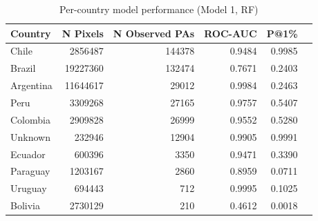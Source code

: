 \begin{table}[h]
\centering
\begin{tabular}{lrrrrr}
\toprule
Country & N Pixels & N Observed PAs & ROC-AUC & P@1\% \\
\midrule
Chile & 2856487 & 144378 & 0.9484 & 0.9985 \\
Brazil & 19227360 & 132474 & 0.7671 & 0.2403 \\
Argentina & 11644617 & 29012 & 0.9984 & 0.2463 \\
Peru & 3309268 & 27165 & 0.9757 & 0.5407 \\
Colombia & 2909828 & 26999 & 0.9552 & 0.5280 \\
Unknown & 232946 & 12904 & 0.9905 & 0.9991 \\
Ecuador & 600396 & 3350 & 0.9471 & 0.3390 \\
Paraguay & 1203167 & 2860 & 0.8959 & 0.0711 \\
Uruguay & 694443 & 712 & 0.9995 & 0.1025 \\
Bolivia & 2730129 & 210 & 0.4612 & 0.0018 \\
\bottomrule
\end{tabular}
\caption{Per-country model performance (Model 1, RF)}
\label{tab:country_breakdown_rf}
\end{table}
